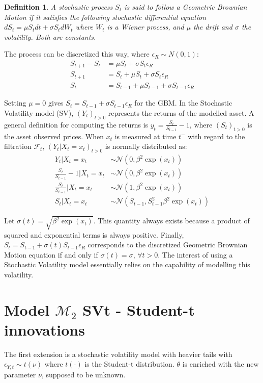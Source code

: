 \documentclass[11pt,a4,twosided,singlespacing,titlepagenumber=on]{scrreprt}
\numberwithin{equation}{chapter} %
\newtheorem{definition}[theorem]{Definition}%
\theoremstyle{remark}
\begin{document}
\begin{definition}
\textit{
A stochastic process $S_t$ is said to follow a Geometric Brownian Motion if it satisfies the following stochastic differential equation
$dS_t = \mu S_t dt + \sigma S_t dW_t$
where $W_t$ is a Wiener process, and $\mu$ the drift and $\sigma$ the volatility. Both are constants.}
\end{definition}

\noindent
The process can be discretized this way, where $\epsilon_R \sim N(0,1)$:
\begin{align*}
S_{t+1}-S_t &= \mu S_t + \sigma S_t \epsilon_R \\
S_{t+1} 	&= S_t + \mu S_t + \sigma S_t \epsilon_R \\
S_t 	&= S_{t-1} + \mu S_{t-1} + \sigma S_{t-1} \epsilon_R
\end{align*}

\noindent
Setting $\mu = 0$ gives $S_t = S_{t-1} + \sigma S_{t-1} \epsilon_R$ for the GBM. In the Stochastic Volatility model (SV), $(Y_t)_{t>0}$ represents the returns of the modelled asset. A general definition for computing the returns is $y_t = \frac{S_t}{S_{t-1}}-1$, where $(S_t)_{t>0}$ is the asset observed prices. When $x_t$ is measured at time $t^-$ with regard to the filtration $\mathcal{F}_t$, $(Y_t|X_t = x_t)_{t>0}$ is normally distributed as:
\begin{align*}
Y_t | X_t = x_t 					&\sim \mathcal{N}(0, \beta^2 \exp(x_t)) \\
\frac{S_t}{S_{t-1}}-1 | X_t = x_t 	&\sim \mathcal{N}(0, \beta^2 \exp(x_t)) \\
\frac{S_t}{S_{t-1}} | X_t = x_t 	&\sim \mathcal{N}(1, \beta^2 \exp(x_t)) \\
S_t | X_t = x_t 					&\sim \mathcal{N}(S_{t-1}, S_{t-1}^2 \beta^2 \exp(x_t))
\end{align*}

\noindent
Let $\sigma(t) = \sqrt{\beta^2 \exp(x_t)}$. This quantity always exists because a product of squared and exponential terms is always positive. Finally, $S_t = S_{t-1} + \sigma(t) S_{t-1} \epsilon_R$ corresponds to the discretized Geometric Brownian Motion equation if and only if $\sigma(t) = \sigma \text{, } \forall t > 0$. The interest of using a Stochastic Volatility model essentially relies on the capability of modelling this volatility.

\section{Model $\mathcal{M}_2$ SVt - Student-t innovations}
The first extension is a stochastic volatility model with heavier tails with $\epsilon_{Y,t} \sim t(\nu)$ where $t(\cdot)$ is the Student-t distribution. $\theta$ is enriched with the new parameter $\nu$, supposed to be unknown.
\end{document}
